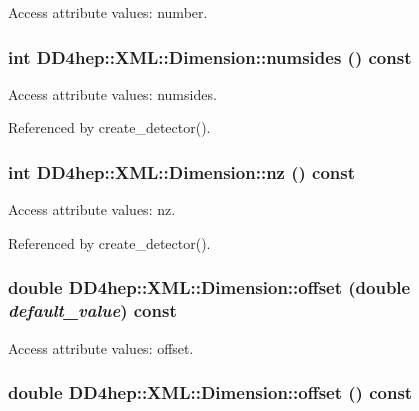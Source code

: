 Access attribute values: number. \hypertarget{struct_d_d4hep_1_1_x_m_l_1_1_dimension_aad36bdbceb76c40112a9ae371d3405ad}{
\subsubsection[{numsides}]{\setlength{\rightskip}{0pt plus 5cm}int DD4hep::XML::Dimension::numsides () const}}
\label{struct_d_d4hep_1_1_x_m_l_1_1_dimension_aad36bdbceb76c40112a9ae371d3405ad}


Access attribute values: numsides. 

Referenced by create\_\-detector().\hypertarget{struct_d_d4hep_1_1_x_m_l_1_1_dimension_a71eaee080c5418821a5facda328ac88f}{
\subsubsection[{nz}]{\setlength{\rightskip}{0pt plus 5cm}int DD4hep::XML::Dimension::nz () const}}
\label{struct_d_d4hep_1_1_x_m_l_1_1_dimension_a71eaee080c5418821a5facda328ac88f}


Access attribute values: nz. 

Referenced by create\_\-detector().\hypertarget{struct_d_d4hep_1_1_x_m_l_1_1_dimension_a7206d0e467ad11a3c2331e3a9f82271c}{
\subsubsection[{offset}]{\setlength{\rightskip}{0pt plus 5cm}double DD4hep::XML::Dimension::offset (double {\em default\_\-value}) const}}
\label{struct_d_d4hep_1_1_x_m_l_1_1_dimension_a7206d0e467ad11a3c2331e3a9f82271c}


Access attribute values: offset. \hypertarget{struct_d_d4hep_1_1_x_m_l_1_1_dimension_a75dff2ab1efe07d2960c188854e59cc0}{
\subsubsection[{offset}]{\setlength{\rightskip}{0pt plus 5cm}double DD4hep::XML::Dimension::offset () const}}
\label{struct_d_d4hep_1_1_x_m_l_1_1_dimension_a75dff2ab1efe07d2960c188854e59cc0}


